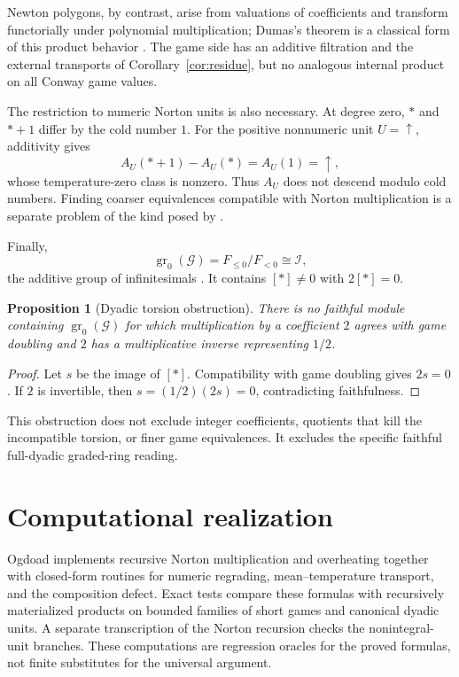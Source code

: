 \documentclass[11pt]{article}
\newtheorem{proposition}[theorem]{Proposition}
\theoremstyle{definition}
\theoremstyle{remark}
\newcommand{\gr}{\operatorname{gr}}
\newcommand{\Games}{\mathcal G}
\newcommand{\Inf}{\mathcal I}
\begin{document}
Newton polygons, by contrast, arise from valuations of coefficients and
transform functorially under polynomial multiplication; Dumas's theorem is a
classical form of this product behavior \cite{dumas1906}.  The game side has
an additive filtration and the external transports of
Corollary~\ref{cor:residue}, but no analogous internal product on all Conway
game values.

The restriction to numeric Norton units is also necessary.  At degree zero,
$*$ and $*+1$ differ by the cold number $1$.  For the positive nonnumeric
unit $U=\uparrow$, additivity gives
\[
 A_U(*+1)-A_U(*)=A_U(1)=\uparrow,
\]
whose temperature-zero class is nonzero.  Thus $A_U$ does not descend modulo
cold numbers.  Finding coarser equivalences compatible with Norton
multiplication is a separate problem of the kind posed by
\cite[Problem 6.10]{altmanlipparini2026}.

Finally,
\[
 \gr_0(\Games)=F_{\le0}/F_{<0}\cong\Inf,
\]
the additive group of infinitesimals \cite{calistrate1996,moews2002}.  It
contains $[*]\ne0$ with $2[*]=0$.

\begin{proposition}[Dyadic torsion obstruction]\label{prop:torsion}
There is no faithful module containing $\gr_0(\Games)$ for which multiplication
by a coefficient $2$ agrees with game doubling and $2$ has a multiplicative
inverse representing $1/2$.
\end{proposition}

\begin{proof}
Let $s$ be the image of $[*]$.  Compatibility with game doubling gives
$2s=0$.  If $2$ is invertible, then $s=(1/2)(2s)=0$, contradicting
faithfulness.
\end{proof}

This obstruction does not exclude integer coefficients, quotients that kill
the incompatible torsion, or finer game equivalences.  It excludes the
specific faithful full-dyadic graded-ring reading.

\section{Computational realization}

Ogdoad \cite{ogdoad2026} implements recursive Norton multiplication and
overheating together with closed-form routines for numeric regrading,
mean--temperature transport, and the composition defect.  Exact tests compare
these formulas with recursively materialized products on bounded families of
short games and canonical dyadic units.  A separate transcription of the
Norton recursion checks the nonintegral-unit branches.  These computations are
regression oracles for the proved formulas, not finite substitutes for the
universal argument.
\end{document}

